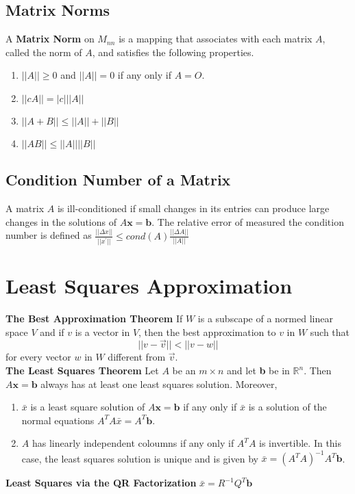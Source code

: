 \subsection{Matrix Norms}
A \textbf{Matrix Norm} on $M_{nn}$ is a mapping that associates with each matrix $A$, called the norm of $A$, and satisfies the following properties.
\begin{enumerate}
    \item $||A|| \geq 0$ and $||A|| = 0$ if any only if $A=O$.
    \item $||cA|| = |c|||A||$
    \item $||A+B|| \leq ||A||+||B||$
    \item $||AB|| \leq ||A|| ||B||$
\end{enumerate}
\subsection{Condition Number of a Matrix}
A matrix $A$ is ill-conditioned if small changes in its entries can produce large changes in the solutions of $A\textbf{x} = \textbf{b}$.
The relative error of measured the condition number is defined as 
$\frac{||\Delta x||}{||x^\prime||}\leq cond(A)\frac{||\Delta A||}{||A||}$
\section{Least Squares Approximation}
\textbf{The Best Approximation Theorem}
If $W$ is a subscape of a normed linear space $V$ and if $v$ is a vector in $V$, then the best approximation to $v$ in $W$ such that
    $$||v-\vec{v}|| < ||v-w||$$
for every vector $w$ in $W$ different from $\vec{v}$.\\
\textbf{The Least Squares Theorem}
Let $A$ be an $m\times n$ and let \textbf{b} be in $\mathbb{R}^n$. Then $A\textbf{x} = \textbf{b}$ always has at least one least squares solution. Moreover,
\begin{enumerate}
    \item $\bar{x}$ is a least square solution of $A\textbf{x} = \textbf{b}$ if any only if $\bar{x}$ is a solution of the normal equations $A^TA\bar{x} = A^T\textbf{b}$.
    \item $A$ has linearly independent coloumns if any only if $A^TA$ is invertible. In this case, the least squares solution is unique and is given by $\bar{x} = (A^TA)^{-1} A^T\textbf{b}$.
\end{enumerate}

\textbf{Least Squares via the QR Factorization}
$\bar{x} = R^{-1}Q^T\textbf{b}$

